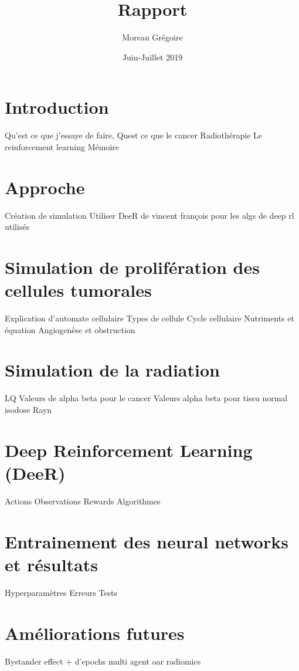 \documentclass[12pt]{article}
\title{Rapport}
\author{Moreau Grégoire}
\date{Juin-Juillet 2019}
\begin{document}
\maketitle

\section{Introduction}
Qu'est ce que j'essaye de faire,
Quest ce que le cancer
Radiothérapie
Le reinforcement learning
Mémoire


\section{Approche}
Création de simulation
Utiliser DeeR de vincent françois pour les algs de deep rl utilisés

\section{Simulation de prolifération des cellules tumorales}
Explication d'automate cellulaire
Types de cellule
Cycle cellulaire
Nutriments et équation
Angiogenèse et obstruction


\section{Simulation de la radiation}
LQ
Valeurs de alpha beta pour le cancer
Valeurs alpha beta pour tissu normal
isodose
Rayn

\section{Deep Reinforcement Learning (DeeR)}
Actions
Observations
Rewards
Algorithmes

\section{Entrainement des neural networks et résultats}
Hyperparamètres
Erreurs
Tests

\section{Améliorations futures}
Bystander effect
+ d'epochs
multi agent
oar
radiomics
\end{document}

